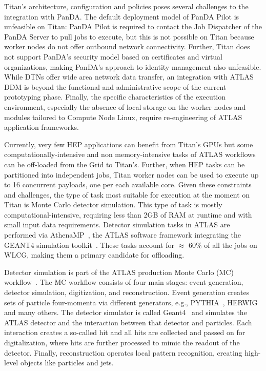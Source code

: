 \documentclass[conference]{IEEEtran}
\begin{document}
Titan's architecture, configuration and policies poses several challenges to the
integration with PanDA. The default deployment
model of PanDA Pilot is unfeasible on Titan: PanDA Pilot is required to contact
the Job Dispatcher of the PanDA Server to pull jobs to execute, but this is not
possible on Titan because worker nodes do not offer outbound network
connectivity. Further, Titan does not support PanDA's security model based on
certificates and virtual organizations, making PanDA's approach to identity
management also unfeasible. While DTNs offer wide area network data transfer, an
integration with ATLAS DDM is beyond the functional and administrative scope of
the current prototyping phase. Finally, the specific characteristics of the
execution environment, especially the absence of local storage on the worker
nodes and modules tailored to Compute Node Linux, require re-engineering of
ATLAS application frameworks.

Currently, very few HEP applications can benefit from Titan's GPUs but some
computationally-intensive and non memory-intensive tasks of ATLAS workflows can
be off-loaded from the Grid to Titan's. Further, when HEP tasks can be
partitioned into independent jobs, Titan worker nodes can be used to execute up
to 16 concurrent payloads, one per each available core. Given these constraints
and challenges, the type of task most suitable for execution at the moment on
Titan is Monte Carlo detector simulation. This type of task is mostly
computational-intensive, requiring less than 2GB of RAM at runtime and with
small input data requirements. Detector simulation tasks in ATLAS are performed
via AthenaMP~\cite{aad2010atlas}, the ATLAS software framework integrating the
GEANT4 simulation toolkit~\cite{agostinelli2003geant4}. These tasks account for
$\approx$ 60\% of all the jobs on WLCG, making them a primary candidate for
offloading.

Detector simulation is part of the ATLAS production Monte Carlo (MC)
workflow~\cite{rimoldi2006atlas,de2013delphes,ritsch2014atlas}. The MC workflow
consists of four main stages: event generation, detector simulation,
digitization, and reconstruction. Event generation creates sets of particle
four-momenta via different generators, e.g., PYTHIA~\cite{sjostrand2006pythia},
HERWIG~\cite{corcella2001herwig} and many others. The detector simulator is
called Geant4~\cite{agostinelli2003geant4} and simulates the ATLAS detector and
the interaction between that detector and particles. Each interaction creates a
so-called hit and all hits are collected and passed on for digitalization, where
hits are further processed to mimic the readout of the detector. Finally,
reconstruction operates local pattern recognition, creating high-level objects
like particles and jets.
\end{document}
